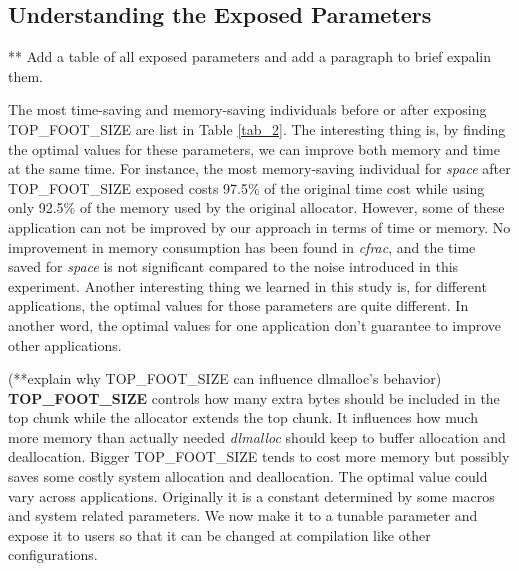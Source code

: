 \subsection{Understanding the Exposed Parameters}

** Add a table of all exposed parameters and add a paragraph to brief expalin them.

The most time-saving and memory-saving individuals before or after exposing TOP\_FOOT\_SIZE are list in Table \ref{tab_2}. The interesting thing is, by finding the optimal values for these parameters, we can improve both memory and time at the same time. For instance, the most memory-saving individual for \emph{space} after TOP\_FOOT\_SIZE exposed costs 97.5\% of the original time cost while using only 92.5\% of the memory used by the original allocator. However, some of these application can not be improved by our approach in terms of time or memory. No improvement in memory consumption has been found in \emph{cfrac}, and the time saved for \emph{space} is not significant compared to the noise introduced in this experiment. Another interesting thing we learned in this study is, for different applications, the optimal values for those parameters are quite different. In another word, the optimal values for one application don't guarantee to improve other applications.


(**explain why TOP\_FOOT\_SIZE can influence dlmalloc's behavior)
\textbf{TOP\_FOOT\_SIZE} controls how many extra bytes should be included in the top chunk while the allocator extends the top chunk. It influences how much more memory than actually needed \emph{dlmalloc} should keep to buffer allocation and deallocation. Bigger TOP\_FOOT\_SIZE tends to cost more memory but possibly saves some costly system allocation and deallocation. The optimal value could vary across applications. Originally it is a constant determined by some macros and system related parameters. We now make it to a tunable parameter and expose it to users so that it can be changed at compilation like other configurations.
